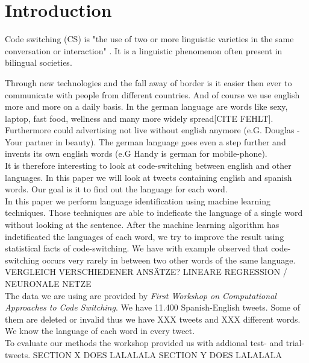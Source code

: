 \section{Introduction}\label{sec:Introduction}

Code switching (CS) is "the use of two
or more linguistic varieties in the same conversation or
interaction" \cite{scotton1977bilingual}. It is a linguistic phenomenon often present in bilingual societies.


Through new technologies and the fall away of border is it easier then ever to communicate with people from different countries. And of course we use english more and more on a daily basis. In the german language are words like sexy, laptop, fast food, wellness and many more widely spread[CITE FEHLT]. Furthermore could advertising not live without english anymore (e.G. Douglas - Your partner in beauty). The german language goes even a step further and invents its own english words (e.G Handy is german for mobile-phone).   \\
It is therefore interesting to look at code-switching between english and other languages. In this paper we will look at tweets containing english and spanish words. Our goal is it to find out the language for each word. \\

In this paper we perform language identification using machine learning techniques. Those techniques are able to indeficate the language of a single word without looking at the sentence. After the machine learning algorithm has indetificated the languages of each word, we try to improve the result using statistical facts of code-switching. We have with example observed that code-switching occurs very rarely in between two other words of the same language.\\VERGLEICH VERSCHIEDENER ANSÄTZE? LINEARE REGRESSION /  NEURONALE NETZE
\\
The data we are using are provided by \textit{First Workshop on Computational Approaches to Code Switching}\cite{workshop}. We have 11.400 Spanish-English tweets. Some of them are deleted or invalid thus we have XXX tweets and XXX different words. We know the language of each word in every tweet. \\
To evaluate our methods the workshop\cite{workshop} provided us with addional test- and trial-tweets.
SECTION X DOES LALALALA SECTION Y DOES LALALALA


